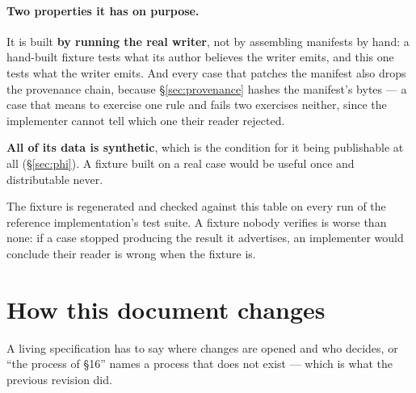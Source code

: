 \documentclass[11pt,a4paper]{article}
\begin{document}
\paragraph{Two properties it has on purpose.}
It is built \textbf{by running the real writer}, not by assembling manifests by hand: a
hand-built fixture tests what its author believes the writer emits, and this one tests what
the writer emits. And every case that patches the manifest also drops the provenance chain,
because \S\ref{sec:provenance} hashes the manifest's bytes --- a case that means to
exercise one rule and fails two exercises neither, since the implementer cannot tell which
one their reader rejected.

\textbf{All of its data is synthetic}, which is the condition for it being publishable at
all (\S\ref{sec:phi}). A fixture built on a real case would be useful once and
distributable never.

The fixture is regenerated and checked against this table on every run of the reference
implementation's test suite. A fixture nobody verifies is worse than none: if a case
stopped producing the result it advertises, an implementer would conclude their reader is
wrong when the fixture is.

\section{How this document changes}\label{sec:process}

A living specification has to say where changes are opened and who decides, or ``the
process of \S16'' names a process that does not exist --- which is what the previous
revision did.
\end{document}
